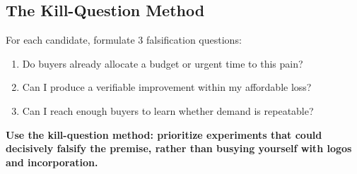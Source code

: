 \subsection{The Kill-Question Method}

For each candidate, formulate 3 falsification questions:
\begin{enumerate}[label=\textbf{\arabic*.},leftmargin=11pt,itemsep=1.5pt,topsep=1.5pt,parsep=0pt]
  \item Do buyers already allocate a budget or urgent time to this pain?
  \item Can I produce a verifiable improvement within my affordable loss?
  \item Can I reach enough buyers to learn whether demand is repeatable?
\end{enumerate}

\textbf{Use the kill-question method: prioritize experiments that could decisively falsify the premise, rather than busying yourself with logos and incorporation.}
